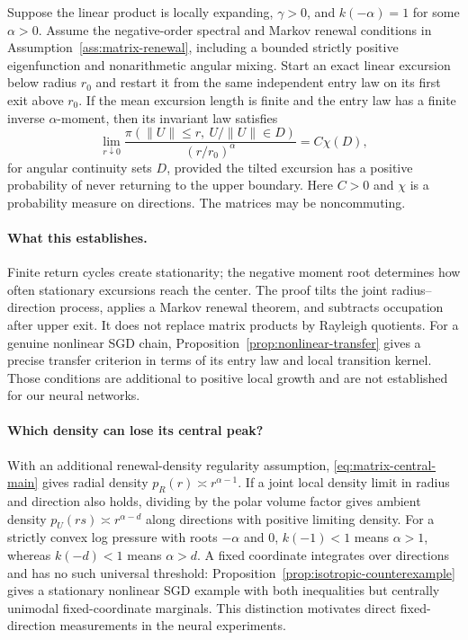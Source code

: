 \begin{theorem}
\label{thm:matrix-central-main}
Suppose the linear product is locally expanding, $\gamma>0$, and
$k(-\alpha)=1$ for some $\alpha>0$.
Assume the negative-order spectral and Markov renewal conditions in
Assumption~\ref{ass:matrix-renewal}, including a bounded strictly
positive eigenfunction and nonarithmetic angular mixing.
Start an exact linear excursion below radius $r_0$ and restart it from
the same independent entry law on its first exit above $r_0$.
If the mean excursion length is finite and the entry law has a finite
inverse $\alpha$-moment, then its invariant law satisfies
\begin{equation}
 \lim_{r\downarrow0}
 \frac{\pi(\|U\|\le r,\ U/\|U\|\in D)}{(r/r_0)^\alpha}
 =C\chi(D),
 \label{eq:matrix-central-main}
\end{equation}
for angular continuity sets $D$, provided the tilted excursion has a positive probability of never
returning to the upper boundary. Here $C>0$ and $\chi$ is a probability
measure on directions. The matrices may be noncommuting.
\end{theorem}

\paragraph{What this establishes.}
Finite return cycles create stationarity; the negative moment root
determines how often stationary excursions reach the center.
The proof tilts the joint radius--direction process, applies a Markov
renewal theorem, and subtracts occupation after upper exit.
It does not replace matrix products by Rayleigh quotients.
For a genuine nonlinear SGD chain, Proposition~\ref{prop:nonlinear-transfer}
gives a precise transfer criterion in terms of its entry law and local
transition kernel. Those conditions are additional to positive local
growth and are not established for our neural networks.

\paragraph{Which density can lose its central peak?}
With an additional renewal-density regularity assumption,
\eqref{eq:matrix-central-main} gives radial density
$p_R(r)\asymp r^{\alpha-1}$.
If a joint local density limit in radius and direction also holds, dividing
by the polar volume factor gives ambient density
$p_U(rs)\asymp r^{\alpha-d}$ along directions with positive limiting density.
For a strictly convex log pressure with roots $-\alpha$ and $0$,
$k(-1)<1$ means $\alpha>1$, whereas $k(-d)<1$ means $\alpha>d$.
A fixed coordinate integrates over directions and has no such universal
threshold: Proposition~\ref{prop:isotropic-counterexample} gives a
stationary nonlinear SGD example with both inequalities but centrally
unimodal fixed-coordinate marginals.
This distinction motivates direct fixed-direction measurements in the
neural experiments.
